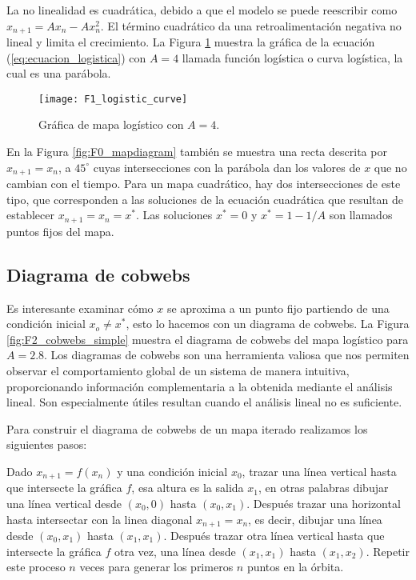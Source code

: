        La no linealidad es cuadrática, debido a que el modelo se puede reescribir como $x_{n+1} = A x_{n} - A x_{n}^{2}$. El término cuadrático da una retroalimentación negativa no lineal y limita el crecimiento. La Figura \ref{fig:F1_logistic_curve} muestra la gráfica de la ecuación (\ref{eq:ecuacion_logistica}) con $A = 4$ llamada función logística o curva logística, la cual es una parábola.

        \begin{figure}[hbtp]
            \centering
            \texttt{[image: F1\_logistic\_curve]}
            \caption{Gráfica de mapa logístico con $A = 4$.}
            \label{fig:F1_logistic_curve}
        \end{figure}

        En la Figura \ref{fig:F0_mapdiagram} también se muestra una recta descrita por $x_{n+1} = x_{n}$, a $45^{\circ}$ cuyas intersecciones con la parábola dan los valores de $x$ que no cambian con el tiempo. Para un mapa cuadrático, hay dos intersecciones de este tipo, que corresponden a las soluciones de la ecuación cuadrática que resultan de establecer $x_{n+1} = x_{n} = x^{*}$. Las soluciones $x^{*} = 0$ y $x^{*} = 1 - 1/A$ son llamados puntos fijos del mapa.

        \subsection{Diagrama de cobwebs}

            Es interesante examinar cómo $x$ se aproxima a un punto fijo partiendo de una condición inicial $x_{o} \neq x^{*}$, esto lo hacemos con un diagrama de cobwebs. La Figura \ref{fig:F2_cobwebs_simple} muestra el diagrama de cobwebs del mapa logístico para $A = 2.8$. Los diagramas de cobwebs son una herramienta valiosa que nos permiten observar el comportamiento global de un sistema de manera intuitiva, proporcionando información complementaria a la obtenida mediante el análisis lineal. Son especialmente útiles resultan cuando el análisis lineal no es suficiente.

            Para construir el diagrama de cobwebs de un mapa iterado realizamos los siguientes pasos:

            Dado $x_{n+1} = f(x_{n})$ y una condición inicial $x_{0}$, trazar una línea vertical hasta que intersecte la gráfica $f$, esa altura es la salida $x_{1}$, en otras palabras dibujar una línea vertical desde $(x_{0}, 0) $ hasta $(x_{0}, x_{1})$. Después trazar una horizontal hasta intersectar con la linea diagonal $x_{n+1} = x_{n}$, es decir, dibujar una línea desde  $(x_{0}, x_{1}) $ hasta $(x_{1}, x_{1})$. Después trazar otra línea vertical hasta que intersecte la gráfica $f$ otra vez, una línea desde $(x_{1}, x_{1}) $ hasta $(x_{1}, x_{2})$. Repetir este proceso $n$ veces para generar los primeros $n$ puntos en la órbita.

